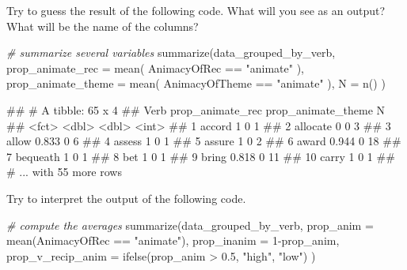 \documentclass[
]{book}
\newenvironment{Shaded}{\begin{snugshade}}{\end{snugshade}}
\newcommand{\AttributeTok}[1]{\textcolor[rgb]{0.77,0.63,0.00}{#1}}
\newcommand{\CommentTok}[1]{\textcolor[rgb]{0.56,0.35,0.01}{\textit{#1}}}
\newcommand{\DecValTok}[1]{\textcolor[rgb]{0.00,0.00,0.81}{#1}}
\newcommand{\FloatTok}[1]{\textcolor[rgb]{0.00,0.00,0.81}{#1}}
\newcommand{\FunctionTok}[1]{\textcolor[rgb]{0.00,0.00,0.00}{#1}}
\newcommand{\NormalTok}[1]{#1}
\newcommand{\SpecialCharTok}[1]{\textcolor[rgb]{0.00,0.00,0.00}{#1}}
\newcommand{\StringTok}[1]{\textcolor[rgb]{0.31,0.60,0.02}{#1}}
\begin{document}
Try to guess the result of the following code. What will you see as an output? What will be the name of the columns?

\begin{Shaded}
\begin{Highlighting}[]
\CommentTok{\# summarize several variables}
\FunctionTok{summarize}\NormalTok{(data\_grouped\_by\_verb, }
          \AttributeTok{prop\_animate\_rec =} \FunctionTok{mean}\NormalTok{( AnimacyOfRec }\SpecialCharTok{==} \StringTok{"animate"}\NormalTok{ ),}
          \AttributeTok{prop\_animate\_theme =} \FunctionTok{mean}\NormalTok{( AnimacyOfTheme }\SpecialCharTok{==} \StringTok{"animate"}\NormalTok{ ),}
          \AttributeTok{N =} \FunctionTok{n}\NormalTok{()}
\NormalTok{          )}
\end{Highlighting}
\end{Shaded}

\begin{Shaded}
\begin{Highlighting}[]
\NormalTok{\#\# \# A tibble: 65 x 4}
\NormalTok{\#\#    Verb     prop\_animate\_rec prop\_animate\_theme     N}
\NormalTok{\#\#    \textless{}fct\textgreater{}               \textless{}dbl\textgreater{}              \textless{}dbl\textgreater{} \textless{}int\textgreater{}}
\NormalTok{\#\#  1 accord              1                      0     1}
\NormalTok{\#\#  2 allocate            0                      0     3}
\NormalTok{\#\#  3 allow               0.833                  0     6}
\NormalTok{\#\#  4 assess              1                      0     1}
\NormalTok{\#\#  5 assure              1                      0     2}
\NormalTok{\#\#  6 award               0.944                  0    18}
\NormalTok{\#\#  7 bequeath            1                      0     1}
\NormalTok{\#\#  8 bet                 1                      0     1}
\NormalTok{\#\#  9 bring               0.818                  0    11}
\NormalTok{\#\# 10 carry               1                      0     1}
\NormalTok{\#\# \# ... with 55 more rows}
\end{Highlighting}
\end{Shaded}

Try to interpret the output of the following code.

\begin{Shaded}
\begin{Highlighting}[]
\CommentTok{\# compute the averages}
\FunctionTok{summarize}\NormalTok{(data\_grouped\_by\_verb, }
          \AttributeTok{prop\_anim =} \FunctionTok{mean}\NormalTok{(AnimacyOfRec }\SpecialCharTok{==} \StringTok{"animate"}\NormalTok{),}
          \AttributeTok{prop\_inanim =} \DecValTok{1}\SpecialCharTok{{-}}\NormalTok{prop\_anim,}
          \AttributeTok{prop\_v\_recip\_anim =} \FunctionTok{ifelse}\NormalTok{(prop\_anim }\SpecialCharTok{\textgreater{}} \FloatTok{0.5}\NormalTok{, }\StringTok{"high"}\NormalTok{, }\StringTok{"low"}\NormalTok{)}
\NormalTok{          )}
\end{Highlighting}
\end{Shaded}
\end{document}
